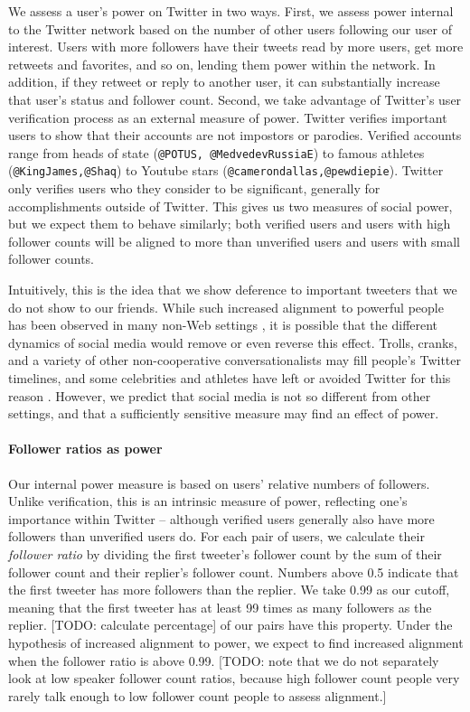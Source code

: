 \documentclass{acm_proc_article-sp}
\begin{document}
We assess a user's power on Twitter in two ways. First, we assess power internal to the Twitter network based on the number of other users following our user of interest.  Users with more followers have their tweets read by more users, get more retweets and favorites, and so on, lending them power within the network.  In addition, if they retweet or reply to another user, it can substantially increase that user's status and follower count.  Second, we take advantage of Twitter's user verification process as an external measure of power.  Twitter verifies important users to show that their accounts are not impostors or parodies.  Verified accounts range from heads of state (\texttt{@POTUS, @MedvedevRussiaE}) to famous athletes (\texttt{@KingJames,@Shaq}) to Youtube stars (\texttt{@camerondallas,@pewdiepie}). Twitter only verifies users who they consider to be significant, generally for accomplishments outside of Twitter.  This gives us two measures of social power, but we expect them to behave similarly; both verified users and users with high follower counts will be aligned to more than unverified users and users with small follower counts.

Intuitively, this is the idea that we show deference to important tweeters that we do not show to our friends. While such increased alignment to powerful people has been observed in many non-Web settings \cite{?}, it is possible that the different dynamics of social media would remove or even reverse this effect.  Trolls, cranks, and a variety of other non-cooperative conversationalists may fill people's Twitter timelines, and some celebrities and athletes have left or avoided Twitter for this reason \cite{?}.  However, we predict that social media is not so different from other settings, and that a sufficiently sensitive measure may find an effect of power.

\paragraph{Follower ratios as power} Our internal power measure is based on users' relative numbers of followers.  Unlike verification, this is an intrinsic measure of power, reflecting one's importance within Twitter -- although verified users generally also have more followers than unverified users do. For each pair of users, we calculate their \textit{follower ratio} by dividing the first tweeter's follower count by the sum of their follower count and their replier's follower count.  Numbers above 0.5 indicate that the first tweeter has more followers than the replier.  We take 0.99 as our cutoff, meaning that the first tweeter has at least 99 times as many followers as the replier.  [TODO: calculate percentage] of our pairs have this property.  Under the hypothesis of increased alignment to power, we expect to find increased alignment when the follower ratio is above 0.99. [TODO: note that we do not separately look at low speaker follower count ratios, because high follower count people very rarely talk enough to low follower count people to assess alignment.]
\end{document}
